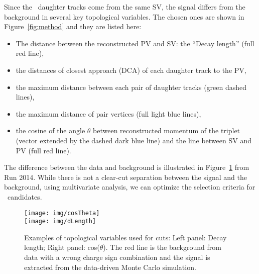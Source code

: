 Since the \Lambdac\ daughter tracks come from the same SV, the signal differs from the background in several key topological variables. The chosen ones are shown in Figure~\ref{fig:method} and they are listed here:
\begin{itemize}
 \item The distance between the reconstructed PV and SV\@: the ``Decay length'' (full red line),
 \item the distances of closest approach (DCA) of each daughter track to the PV,
 \item the maximum distance between each pair of daughter tracks (green dashed lines),
 \item the maximum distance of pair vertices (full light blue lines),
 \item the cosine of the angle $\theta$ between reconstructed momentum of the triplet (vector extended by the dashed dark blue line) and the line between SV and PV (full red line).
\end{itemize}
The difference between the data and background is illustrated in Figure~\ref{fig:optimization} from Run 2014\@. While there is not a clear-cut separation between the signal and the background, using multivariate analysis, we can optimize the selection criteria for \Lambdac\ candidates.

\begin{figure}[!htb]
\centering
\texttt{[image: img/cosTheta]}\\[1cm]
\texttt{[image: img/dLength]}
\caption{\label{fig:optimization}Examples of topological variables used for cuts: Left panel: Decay length; Right panel: cos($\theta$)\@. The red line is the background from data with a wrong charge sign combination and the signal is extracted from the data-driven Monte Carlo simulation.}

\end{figure}

